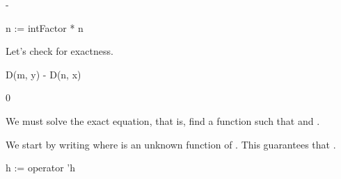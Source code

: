 {{{{{{{{{{{{{{{{\begin{xtc}
\begin{TeXOutput}
\begin{fricasmath}{10}
-{}%
\end{fricasmath}
\end{TeXOutput}
\end{xtc}
\begin{xtc}
\begin{xtccomment}
\end{xtccomment}
\begin{spadsrc}
n := intFactor * n 
\end{spadsrc}
\begin{TeXOutput}
\begin{fricasmath}{11}
%
\end{fricasmath}
\end{TeXOutput}
\end{xtc}
%
\begin{xtc}
\begin{xtccomment}
Let's check for exactness.
\end{xtccomment}
\begin{spadsrc}
D(m, y) - D(n, x) 
\end{spadsrc}
\begin{TeXOutput}
\begin{fricasmath}{12}
0%
\end{fricasmath}
\end{TeXOutput}
\end{xtc}
%
We must solve the exact equation, that is, find a function
 such that
  and .
%
\begin{xtc}
\begin{xtccomment}
We start by writing 
where  is an unknown function of .
This guarantees that .
\end{xtccomment}
\begin{spadsrc}
h := operator 'h 
\end{spadsrc}
\begin{TeXOutput}
\begin{fricasmath}{13}
%
\end{fricasmath}
\end{TeXOutput}
\end{xtc}
\begin{xtc}
\begin{xtccomment}
\end{xtccomment}

\end{xtc}}}}}}}}}}}}}}}}}
